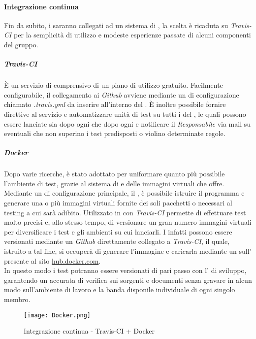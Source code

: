\documentclass{scalatekids-article}
\begin{document}
\paragraph{Integrazione continua}
Fin da subito, i  saranno collegati ad un sistema di
, la scelta è ricaduta su \textit{Travis-CI} per la
semplicità di utilizzo e modeste esperienze passate di alcuni componenti del
gruppo.
\subparagraph{Travis-CI}
È un servizio di  comprensivo di un piano di
utilizzo gratuito. Facilmente configurabile, il collegamento ai 
\textit{Github} avviene mediante un  di configurazione chiamato \textit{.travis.yml}
da inserire all'interno del . È inoltre possibile fornire
direttive al servizio e automatizzare unità di test su tutti i  del
, le quali possono essere lanciate sia dopo ogni 
che dopo ogni  e notificare il \textit{Responsabile} via mail su
eventuali  che non superino i test predisposti o violino
determinate regole.
\subparagraph{Docker}
Dopo varie ricerche,  è stato adottato per uniformare quanto più
possibile l'ambiente di test, grazie al sistema di  e
 delle immagini virtuali che offre.\\ Mediante un  di
configurazione principale, il , è possibile istruire il
programma e generare una o più immagini virtuali fornite dei soli pacchetti o
 necessari al testing a cui sarà adibito. Utilizzato in  con
\textit{Travis-CI} permette di effettuare test molto precisi e, allo stesso
tempo, di versionare un gran numero immagini virtuali per diversificare i test e
gli ambienti su cui lanciarli. I  infatti possono essere
versionati mediante un  \textit{Github} direttamente collegato a
\textit{Travis-CI}, il quale, istruito a tal fine, si occuperà di generare
l'immagine  e caricarla mediante un  sull'
 presente al sito \url{hub.docker.com}.\\ In questo modo i test
potranno essere versionati di pari passo con l' di sviluppo, garantendo
un accurata  di verifica sui sorgenti e documenti senza gravare in alcun
modo sull'ambiente di lavoro e la banda disponile individuale di ogni singolo
membro.
\begin{figure}[H]
  \centering
  \texttt{[image: Docker.png]}
  \caption{Integrazione continua - Travis-CI + Docker}
\end{figure}
\end{document}
